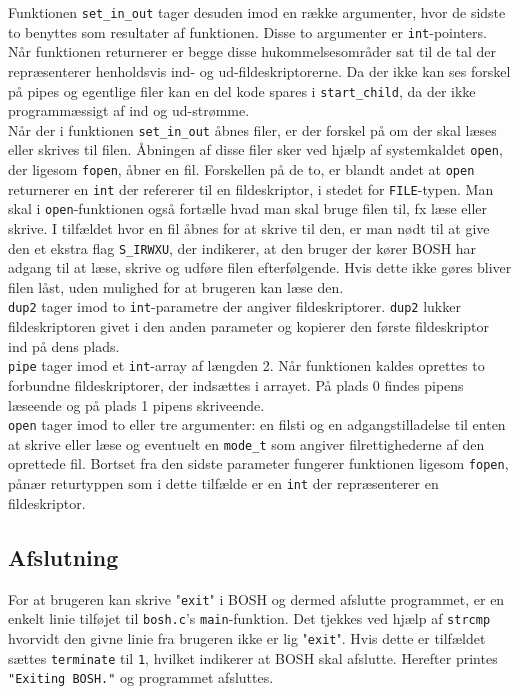 Funktionen \texttt{set\_in\_out} tager desuden imod en række argumenter, hvor de sidste to benyttes som resultater af funktionen. Disse to argumenter er \texttt{int}-pointers. Når funktionen returnerer er begge disse hukommelsesområder sat til de tal der repræsenterer henholdsvis ind- og ud-fildeskriptorerne. Da der ikke kan ses forskel på pipes og egentlige filer kan en del kode spares i \texttt{start\_child}, da der ikke programmæssigt af ind og ud-strømme.\\

Når der i funktionen \texttt{set\_in\_out} åbnes filer, er der forskel på om der skal læses eller skrives til filen. Åbningen af disse filer sker ved hjælp af systemkaldet \texttt{open}, der ligesom \texttt{fopen}, åbner en fil. Forskellen på de to, er blandt andet at \texttt{open} returnerer en \texttt{int} der refererer til en fildeskriptor, i stedet for \texttt{FILE}-typen. Man skal i \texttt{open}-funktionen også fortælle hvad man skal bruge filen til, fx læse eller skrive. I tilfældet hvor en fil åbnes for at skrive til den, er man nødt til at give den et ekstra flag \texttt{S\_IRWXU}, der indikerer, at den bruger der kører BOSH har adgang til at læse, skrive og udføre filen efterfølgende. Hvis dette ikke gøres bliver filen låst, uden mulighed for at brugeren kan læse den.\\

\texttt{dup2} tager imod to \texttt{int}-parametre der angiver fildeskriptorer. \texttt{dup2} lukker fildeskriptoren givet i den anden parameter og kopierer den første fildeskriptor ind på dens plads.\\

\texttt{pipe} tager imod et \texttt{int}-array af længden 2. Når funktionen kaldes oprettes to forbundne fildeskriptorer, der indsættes i arrayet. På plads 0 findes pipens læseende og på plads 1 pipens skriveende.\\

\texttt{open} tager imod to eller tre argumenter: en filsti og en adgangstilladelse til enten at skrive eller læse og eventuelt en \texttt{mode\_t} som angiver filrettighederne af den oprettede fil. Bortset fra den sidste parameter fungerer funktionen ligesom \texttt{fopen}, pånær returtyppen som i dette tilfælde er en \texttt{int} der repræsenterer en fildeskriptor.

\subsection{Afslutning}
For at brugeren kan skrive "\texttt{exit}" i BOSH og dermed afslutte programmet, er en enkelt linie tilføjet til \texttt{bosh.c}'s \texttt{main}-funktion. Det tjekkes ved hjælp af \texttt{strcmp} hvorvidt den givne linie fra brugeren ikke er lig "\texttt{exit}". Hvis dette er tilfældet sættes \texttt{terminate} til \texttt{1}, hvilket indikerer at BOSH skal afslutte. Herefter printes \texttt{"Exiting BOSH."} og programmet afsluttes. \\

